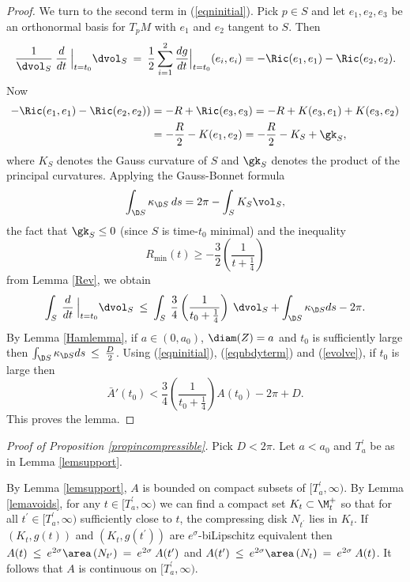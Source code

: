 \begin{proof}
We turn to the second term in (\ref{eqninitial}).  Pick $p\in S$
and let $e_1,e_2,e_3$ be an orthonormal basis for $T_pM$ with
$e_1$ and $e_2$ tangent to $S$.  Then
\begin{equation}
\frac{1}{\dvol_S} \: \frac{d}{dt} \: \Big|_{t=t_0} \dvol_S \: = \: \frac12
\sum_{i=1}^2 \frac{dg}{dt} \Big|_{t=t_0} (e_i, e_i)
= -\Ric(e_1,e_1)-\Ric(e_2,e_2).
\end{equation}
Now
\begin{align}
-\Ric(e_1,e_1)-\Ric(e_2,e_2)) & =-R+\Ric(e_3,e_3)
=-R+K(e_3,e_1)+K(e_3,e_2) \\
& =-\frac{R}{2}-K(e_1,e_2)
=-\frac{R}{2}-K_S+\gk_S, \notag
\end{align}
where $K_S$ denotes the Gauss curvature of $S$ and $\gk_S$
denotes the product of the principal curvatures.  Applying the Gauss-Bonnet formula
\begin{equation}
\int_{\D S}\kappa_{\D S}\:ds=2\pi-\int_S K_S\vol_S,
\end{equation}
the fact that $\gk_S\leq 0$
(since $S$ is time-$t_0$ minimal)
and the inequality
\begin{equation}
R_{\min}(t)\geq -\frac{3}{2}\left(\frac{1}{t+\frac14}\right)
\end{equation}
from Lemma \ref{Rev}, we obtain
\begin{equation} \label{evolve}
\int_S\:\frac{d}{dt} \: \Big|_{t=t_0} \dvol_S \: \le \:
\int_S\:\frac34\left(\frac{1}{t_0+\frac14}\right) \: \dvol_S+\int_{\D S}\kappa_{\D S}ds-2\pi.
\end{equation}
By Lemma \ref{Hamlemma}, if $a \in (0,a_0)$, $\diam(Z) = a$ and $t_0$ is
sufficiently large then
$\int_{\D S}\kappa_{\D S}ds \: \le \: \frac{D}{2}$.
Using (\ref{eqninitial}), (\ref{eqnbdyterm}) and (\ref{evolve}),
if $t_0$ is large then
\begin{equation}
\bar A'(t_0)< \frac34\left(\frac{1}{t_0+\frac14}\right)A(t_0)-2\pi+D.
\end{equation}
This proves the lemma.
\end{proof}
\noindent
{\em Proof of Proposition \ref{propincompressible}.}
Pick $D<2\pi$. Let $a<a_0$ and $T^\prime_a$ be as in Lemma
\ref{lemsupport}.

By Lemma \ref{lemsupport}, $A$ is bounded on compact subsets of
$[T^\prime_a, \infty)$.
By Lemma \ref{lemavoids}, for any
$t \in [T^\prime_a, \infty)$ we can find a compact set $K_t \subset \M_t^+$
so that for all $t^\prime \in [T^\prime_a, \infty)$ sufficiently close to $t$,
the compressing disk $N_{t^\prime}$ lies in $K_t$. If
$(K_t, g(t))$ and $(K_t, g(t^\prime))$ are $e^\sigma$-biLipschitz
equivalent then $A(t) \: \le \: e^{2\sigma} \area \left( N_{t^\prime} \right)
\: = \: e^{2 \sigma} \: A(t^\prime)$ and
$A(t^\prime) \: \le \: e^{2\sigma} \area \left( N_{t} \right)
\: = \: e^{2 \sigma} \: A(t)$. It follows that $A$ is continuous
on $[T^\prime_a, \infty)$.


